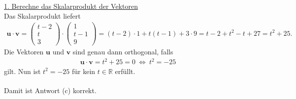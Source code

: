 \underline{1. Berechne das Skalarprodukt der Vektoren}\\
Das Skalarprodukt liefert
\begin{align*}
\textbf{u} \cdot \textbf{v}
=
\begin{pmatrix}
t-2 \\ t \\ 3
\end{pmatrix}
\cdot 
\begin{pmatrix}
1 \\ t-1 \\ 9
\end{pmatrix}
=
(t-2) \cdot 1 + t ( t-1) + 3 \cdot 9
=
t-2 + t^2 -t + 27
=t^2 + 25.
\end{align*}
Die Vektoren $ \textbf{u} $ und $ \textbf{v} $ sind genau dann orthogonal, falls
\begin{align*}
\textbf{u} \cdot \textbf{v} = t^2 + 25 = 0
\ \Leftrightarrow \
t^2 = -25
\end{align*}
gilt. Nun ist $ t^2 = -25 $ für kein $ t \in \mathbb{R} $ erfüllt.\\
\\
Damit ist Antwort (c) korrekt.
\newpage
